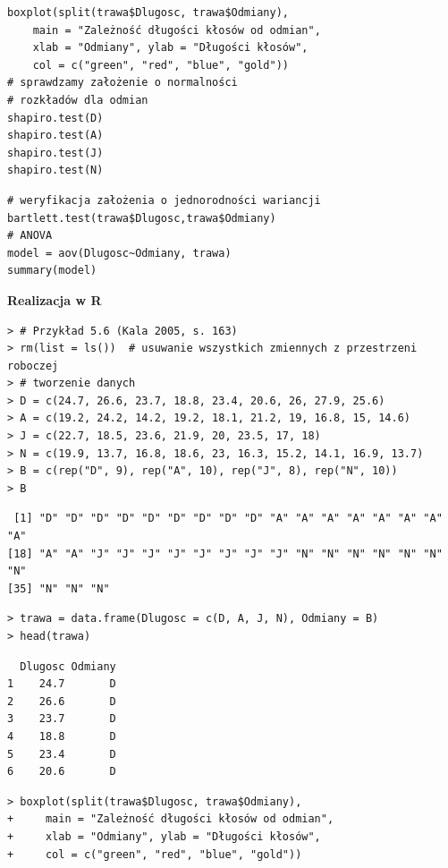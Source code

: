 \documentclass[12pt,B5paper,]{book}
\begin{document}
\begin{verbatim}
boxplot(split(trawa$Dlugosc, trawa$Odmiany), 
    main = "Zależność długości kłosów od odmian", 
    xlab = "Odmiany", ylab = "Długości kłosów", 
    col = c("green", "red", "blue", "gold"))
# sprawdzamy założenie o normalności
# rozkładów dla odmian
shapiro.test(D)
shapiro.test(A)
shapiro.test(J)
shapiro.test(N)
\end{verbatim}

\begin{verbatim}
# weryfikacja założenia o jednorodności wariancji
bartlett.test(trawa$Dlugosc,trawa$Odmiany)
# ANOVA
model = aov(Dlugosc~Odmiany, trawa)
summary(model)
\end{verbatim}

\textbf{Realizacja w R}

\begin{verbatim}
> # Przykład 5.6 (Kala 2005, s. 163)
> rm(list = ls())  # usuwanie wszystkich zmiennych z przestrzeni roboczej
> # tworzenie danych
> D = c(24.7, 26.6, 23.7, 18.8, 23.4, 20.6, 26, 27.9, 25.6)
> A = c(19.2, 24.2, 14.2, 19.2, 18.1, 21.2, 19, 16.8, 15, 14.6)
> J = c(22.7, 18.5, 23.6, 21.9, 20, 23.5, 17, 18)
> N = c(19.9, 13.7, 16.8, 18.6, 23, 16.3, 15.2, 14.1, 16.9, 13.7)
> B = c(rep("D", 9), rep("A", 10), rep("J", 8), rep("N", 10))
> B
\end{verbatim}

\begin{verbatim}
 [1] "D" "D" "D" "D" "D" "D" "D" "D" "D" "A" "A" "A" "A" "A" "A" "A" "A"
[18] "A" "A" "J" "J" "J" "J" "J" "J" "J" "J" "N" "N" "N" "N" "N" "N" "N"
[35] "N" "N" "N"
\end{verbatim}

\begin{verbatim}
> trawa = data.frame(Dlugosc = c(D, A, J, N), Odmiany = B)
> head(trawa)
\end{verbatim}

\begin{verbatim}
  Dlugosc Odmiany
1    24.7       D
2    26.6       D
3    23.7       D
4    18.8       D
5    23.4       D
6    20.6       D
\end{verbatim}

\begin{verbatim}
> boxplot(split(trawa$Dlugosc, trawa$Odmiany), 
+     main = "Zależność długości kłosów od odmian", 
+     xlab = "Odmiany", ylab = "Długości kłosów", 
+     col = c("green", "red", "blue", "gold"))
\end{verbatim}
\end{document}
